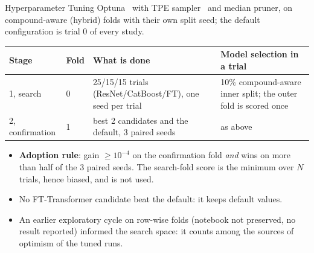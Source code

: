 \documentclass[aspectratio=169,10pt]{beamer}
\begin{document}
\begin{frame}{Hyperparameter Tuning}
\small
Optuna~\cite{optuna} with TPE sampler~\cite{tpe} and median pruner, on compound-aware (hybrid) folds with their own split seed; the default configuration is trial 0 of every study.
\vspace{0.3em}

\begin{tabular}{p{} p{} p{} p{}}
\toprule
\textbf{Stage} & \textbf{Fold} & \textbf{What is done} & \textbf{Model selection in a trial}\\
\midrule
1, search & 0 & 25/15/15 trials (ResNet/CatBoost/FT), one seed per trial & 10\% compound-aware inner split; the outer fold is scored once\\
2, confirmation & 1 & best 2 candidates and the default, 3 paired seeds & as above\\
\bottomrule
\end{tabular}
\vspace{0.4em}
\begin{itemize}
  \item \textbf{Adoption rule}: gain $\ge 10^{-4}$ on the confirmation fold \emph{and} wins on more than half of the 3 paired seeds. The search-fold score is the minimum over $N$ trials, hence biased, and is not used.
  \item No FT-Transformer candidate beat the default: it keeps default values.
  \item An earlier exploratory cycle on row-wise folds (notebook not preserved, no result reported) informed the search space: it counts among the sources of optimism of the tuned runs.
\end{itemize}
\end{frame}
\end{document}
